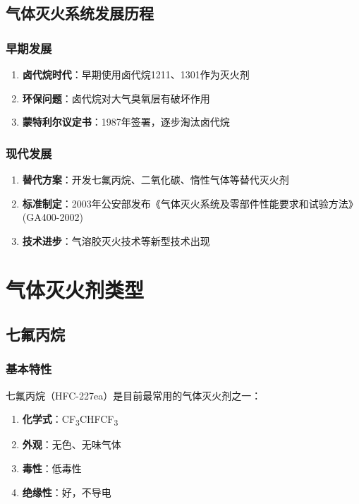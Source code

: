 \documentclass[12pt,UTF8]{ctexbook}
\begin{document}
\chapter{气体灭火系统发展历程}

\section{早期发展}

\begin{enumerate}
    \item \textbf{卤代烷时代}：早期使用卤代烷1211、1301作为灭火剂
    \item \textbf{环保问题}：卤代烷对大气臭氧层有破坏作用
    \item \textbf{蒙特利尔议定书}：1987年签署，逐步淘汰卤代烷
\end{enumerate}

\section{现代发展}

\begin{enumerate}
    \item \textbf{替代方案}：开发七氟丙烷、二氧化碳、惰性气体等替代灭火剂
    \item \textbf{标准制定}：2003年公安部发布《气体灭火系统及零部件性能要求和试验方法》(GA400-2002)
    \item \textbf{技术进步}：气溶胶灭火技术等新型技术出现
\end{enumerate}

\part{气体灭火剂类型}

\chapter{七氟丙烷}

\section{基本特性}

七氟丙烷（HFC-227ea）是目前最常用的气体灭火剂之一：

\begin{enumerate}
    \item \textbf{化学式}：CF\textsubscript{3}CHFCF\textsubscript{3}
    \item \textbf{外观}：无色、无味气体
    \item \textbf{毒性}：低毒性
    \item \textbf{绝缘性}：好，不导电
\end{enumerate}
\end{document}
